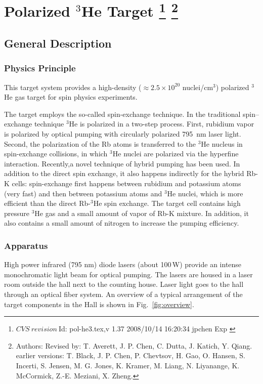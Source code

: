 \chapter[Polarized $^3$He Target]{Polarized $^3$He Target
\footnote{
  $CVS~revision~ $Id: pol-he3.tex,v 1.37 2008/10/14 16:20:34 jpchen Exp $ $
}
\footnote{Authors: Revised by: T. Averett, J. P. Chen, C. Dutta, J. Katich,
Y. Qiang. earlier versions: 
T. Black, J. P. Chen, P. Chevtsov, H. Gao, 
O. Hansen, S. Incerti, S. Jensen, M. G. Jones, K. Kramer, M. Liang, 
N. Liyanange, K. McCormick, Z.-E. Meziani, X. Zheng.
}
}

\section{General Description}
\label{sec:target-he3-general}
\subsection{Physics Principle}

This target system provides a high-density 
($\approx 2.5\times 10^{20}$ nuclei/cm$^3$)
polarized $^3$He gas target for spin physics experiments. 

The target employs the so-called spin-exchange technique.
In the traditional spin--exchange technique $^3$He is polarized in 
a two-step process.
First, rubidium vapor is polarized by optical pumping with
circularly polarized 795~nm laser light. Second, the polarization
of the Rb atoms is transferred to the $^3$He nucleus in spin-exchange
collisions, in which $^3$He nuclei are polarized via the hyperfine interaction.
Recently,a novel technique of hybrid pumping has been used.  
In addition to the direct spin exchange, it also happens indirectly for the 
hybrid Rb-K cells: spin-exchange first happens between rubidium and potassium atoms 
(very fast) and 
then between potassium atoms and $^3$He nuclei, which is more efficient 
than the direct Rb-$^3$He spin exchange.
The target cell contains high pressure $^3$He gas and a small amount of
vapor of Rb-K mixture. 
In addition, it
also contains a small amount of nitrogen to increase the
pumping efficiency.

\subsection{Apparatus}

High power infrared (795 nm) diode lasers (about 100\,W) provide an intense 
monochromatic
light beam for optical pumping. 
The lasers are housed in a laser room
outside the hall next to the counting house. Laser light goes to the hall 
through an optical fiber system.  An overview of a
typical arrangement of the target components in the Hall is shown in
Fig.~\ref{fig:overview}.

